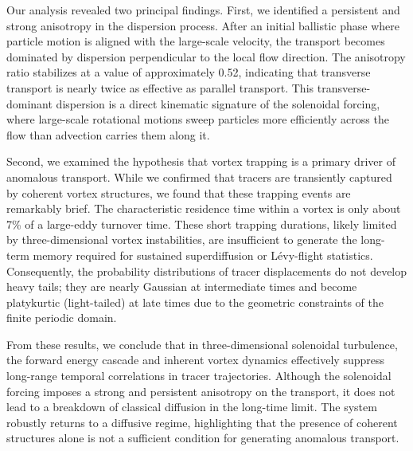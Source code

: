 \documentclass[]{article}
\begin{document}
Our analysis revealed two principal findings. First, we identified a persistent and strong anisotropy in the dispersion process. After an initial ballistic phase where particle motion is aligned with the large-scale velocity, the transport becomes dominated by dispersion perpendicular to the local flow direction. The anisotropy ratio stabilizes at a value of approximately 0.52, indicating that transverse transport is nearly twice as effective as parallel transport. This transverse-dominant dispersion is a direct kinematic signature of the solenoidal forcing, where large-scale rotational motions sweep particles more efficiently across the flow than advection carries them along it.

Second, we examined the hypothesis that vortex trapping is a primary driver of anomalous transport. While we confirmed that tracers are transiently captured by coherent vortex structures, we found that these trapping events are remarkably brief. The characteristic residence time within a vortex is only about 7\% of a large-eddy turnover time. These short trapping durations, likely limited by three-dimensional vortex instabilities, are insufficient to generate the long-term memory required for sustained superdiffusion or Lévy-flight statistics. Consequently, the probability distributions of tracer displacements do not develop heavy tails; they are nearly Gaussian at intermediate times and become platykurtic (light-tailed) at late times due to the geometric constraints of the finite periodic domain.

From these results, we conclude that in three-dimensional solenoidal turbulence, the forward energy cascade and inherent vortex dynamics effectively suppress long-range temporal correlations in tracer trajectories. Although the solenoidal forcing imposes a strong and persistent anisotropy on the transport, it does not lead to a breakdown of classical diffusion in the long-time limit. The system robustly returns to a diffusive regime, highlighting that the presence of coherent structures alone is not a sufficient condition for generating anomalous transport.


{}

\end{document}
